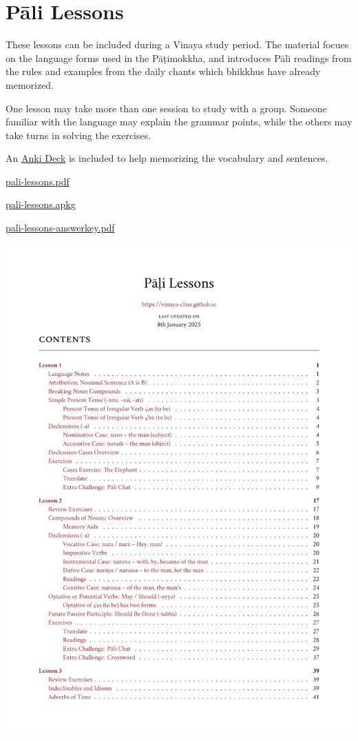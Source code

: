 \chapter{Pāli Lessons}

These lessons can be included during a Vinaya study period. The material
focues on the language forms used in the Pāṭimokkha, and introduces Pāli
readings from the rules and examples from the daily chants which
bhikkhus have already memorized.

One lesson may take more than one session to study with a group. Someone
familiar with the language may explain the grammar points, while the
others may take turns in solving the exercises.

An \href{https://apps.ankiweb.net/}{Anki Deck} is included to help
memorizing the vocabulary and sentences.

\href{./includes/docs/pali-lessons.pdf}{pali-lessons.pdf}

\href{./includes/docs/pali-lessons.apkg}{pali-lessons.apkg}

\href{./includes/docs/pali-lessons-answerkey.pdf}{pali-lessons-answerkey.pdf}

\href{./includes/docs/pali-lessons.pdf}{\includegraphics{./includes/docs/pali-lessons-thumb.png}}

